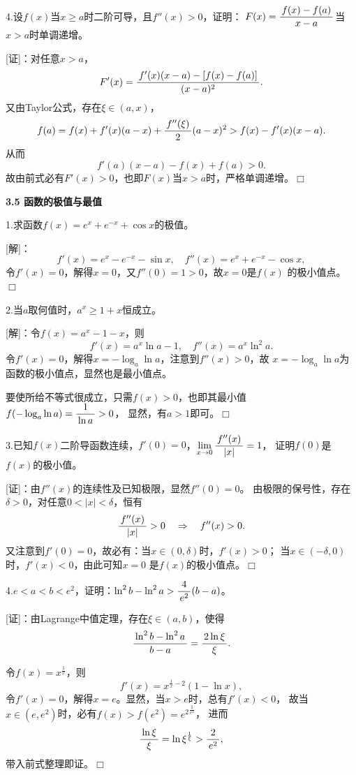 4.设$f(x)$当$x\geq a$时二阶可导，且$f''(x)>0$，证明：
$F(x)=\displaystyle\frac{\,{f(x)-f(a)}\,}{\,{x-a}\,}$当$x>a$时单调递增。

[证]：对任意$x>a$，
$$F'(x)=\displaystyle\frac{\,{f'(x)(x-a)-[f(x)-f(a)]}\,}{\,{(x-a)^2}\,}.$$
又由Taylor公式，存在$\xi\in(a,x)$，
$$f(a)=f(x)+f'(x)(a-x)+\displaystyle\frac{\,{f''(\xi)}\,}{\,{2}\,}(a-x)^2
>f(x)-f'(x)(x-a).$$
从而
$$f'(a)(x-a)-f(x)+f(a)>0.$$
故由前式必有$F'(x)>0$，也即$F(x)$当$x>a$时，严格单调递增。\hfill$\Box$

\begin{center}
	\bf 3.5 函数的极值与最值
\end{center}

\bigskip

1.求函数$f(x)=e^x+e^{-x}+\cos x$的极值。

[解]：
$$f'(x)=e^x-e^{-x}-\sin x,\quad f''(x)=e^x+e^{-x}-\cos x,$$
令$f'(x)=0$，解得$x=0$，又$f''(0)=1>0$，故$x=0$是$f(x)$
的极小值点。
\hfill$\Box$

\bigskip

2.当$a$取何值时，$a^x\geq1+x$恒成立。

[解]：令$f(x)=a^x-1-x$，则
$$f'(x)=a^x\ln a-1,\quad f''(x)=a^x\ln^2a.$$
令$f'(x)=0$，解得$x=-\log_a\ln a$，注意到$f''(x)>0$，故
$x=-\log_a\ln a$为函数的极小值点，显然也是最小值点。

要使所给不等式很成立，只需$f(x)>0$，也即其最小值
$f(-\log_a\ln a)=\displaystyle\frac{\,{1}\,}{\,{\ln a}\,}>0$，
显然，有$a>1$即可。\hfill$\Box$

\bigskip

3.已知$f(x)$二阶导函数连续，$f'(0)=0$，$\lim\limits_{x\to{0}}\displaystyle\frac{\,{f''(x)}\,}{\,{|x|}\,}=1$，
证明$f(0)$是$f(x)$的极小值。

[证]：由$f''(x)$的连续性及已知极限，显然$f''(0)=0$。
由极限的保号性，存在$\delta>0$，对任意$0<|x|<\delta$，恒有
$$\displaystyle\frac{\,{f''(x)}\,}{\,{|x|}\,}>0\quad
\Rightarrow\quad f''(x)>0.$$
又注意到$f'(0)=0$，故必有：当$x\in(0,\delta)$时，$f'(x)>0$；
当$x\in(-\delta,0)$时，$f'(x)<0$，由此可知$x=0$
是$f(x)$的极小值点。\hfill$\Box$

\bigskip

4.$e<a<b<e^2$，证明：$\ln^2b-\ln^2a>\displaystyle\frac{\,{4}\,}{\,{e^2}\,}(b-a)$。

[证]：由Lagrange中值定理，存在$\xi\in(a,b)$，使得
$$\displaystyle\frac{\,{\ln^2b-\ln^2a}\,}{\,{b-a}\,}=\displaystyle\frac{\,{2\ln\xi}\,}{\,{\xi}\,}.$$

令$f(x)=x^{\frac1x}$，则
$$f'(x)=x^{\frac1x-2}(1-\ln x),$$
令$f'(x)=0$，解得$x=e$。显然，当$x>e$时，总有$f'(x)<0$，
故当$x\in(e,e^2)$时，必有$f(x)>f(e^2)={e^2}^{\frac1{e^2}}$，
进而
$$\displaystyle\frac{\,{\ln\xi}\,}{\,{\xi}\,}=\ln\xi^{\frac1{\xi}}>\displaystyle\frac{\,{2}\,}{\,{e^2}\,},$$
带入前式整理即证。\hfill$\Box$

\bigskip

